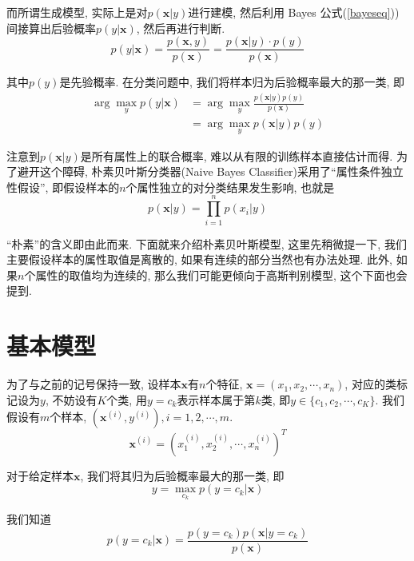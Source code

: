 \documentclass[a4paper,UTF8]{ctexart}
\theoremstyle{plain} \newtheorem{theorem}{定理}[section]
\theoremstyle{plain} \newtheorem{definition}{定义}[section]
\theoremstyle{plain} \newtheorem{lemma}{引理}[section]
\theoremstyle{plain} \newtheorem{proposition}{命题}[section]
\theoremstyle{plain} \newtheorem{example}{例}[section]
\theoremstyle{plain} \newtheorem{remark}{注}[section]
\theoremstyle{plain} \newtheorem{corollary}{推论}[section]
\begin{document}
而所谓生成模型, 实际上是对$p(\bm{x} | y)$进行建模, 然后利用 Bayes 公式(\ref{bayeseq}))间接算出后验概率$p(y | \bm{x})$, 然后再进行判断.
\begin{equation}\label{bayeseq}
p(y | \bm{x}) = \frac{p(\bm{x}, y)}{p(\bm{x})} = \frac{p(\bm{x} | y) \cdot p(y)}{p(\bm{x})}
\end{equation}

其中$p(y)$是先验概率. 在分类问题中, 我们将样本归为后验概率最大的那一类, 即
\begin{align*}
\arg \max_{y} p(y | \bm{x}) & = \arg \max_{y} \frac{p(\bm{x} | y) p(y)}{p(\bm{x})} \\ 
& = \arg \max_{y} p(\bm{x} | y) p(y)
\end{align*}

注意到$p(\bm{x} | y)$是所有属性上的联合概率, 难以从有限的训练样本直接估计而得. 为了避开这个障碍, 朴素贝叶斯分类器(Naive Bayes Classifier)采用了“属性条件独立性假设”, 即假设样本的$n$个属性独立的对分类结果发生影响, 也就是
\begin{equation*}
p(\bm{x} | y) = \prod_{i=1}^{n} p(x_{i} | y)
\end{equation*}

“朴素”的含义即由此而来. 下面就来介绍朴素贝叶斯模型, 这里先稍微提一下, 我们主要假设样本的属性取值是离散的, 如果有连续的部分当然也有办法处理. 此外, 如果$n$个属性的取值均为连续的, 那么我们可能更倾向于高斯判别模型, 这个下面也会提到.


\section{基本模型}
为了与之前的记号保持一致, 设样本$\bm{x}$有$n$个特征, $\bm{x} = (x_1, x_2, \cdots, x_n)$, 对应的类标记设为$y$, 不妨设有$K$个类, 用$y = c_{k}$表示样本属于第$k$类, 即$y \in \{c_1, c_2, \cdots, c_K\}$. 我们假设有$m$个样本, $(\bm{x}^{(i)}, y^{(i)}), i = 1, 2, \cdots, m$. 
\begin{equation*}
\bm{x}^{(i)} = (x_{1}^{(i)}, x_{2}^{(i)}, \cdots, x_{n}^{(i)})^{T}
\end{equation*}


对于给定样本$\bm{x}$, 我们将其归为后验概率最大的那一类, 即
\begin{equation*}
y = \max_{c_k} p(y = c_k | \bm{x})
\end{equation*}

我们知道
\begin{equation*}
p(y = c_k | \bm{x}) = \frac{p(y = c_k) p(\bm{x} | y = c_k)}{p(\bm{x})}
\end{equation*}
\end{document}
